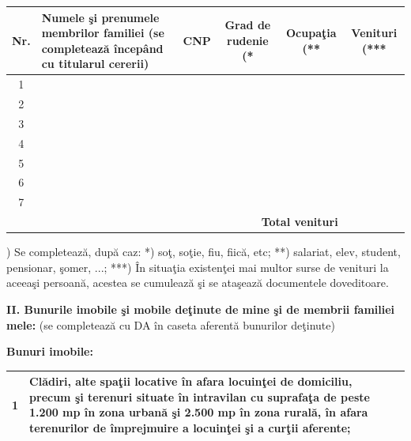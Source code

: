 \documentclass[11pt,a4paper]{article}
\newcommand{\fillline}[1][6cm]{\underline{\hspace{#1}}}
\begin{document}
\renewcommand{\arraystretch}{1.15}
\small
\begin{tabularx}{\textwidth}{|c|X|c|c|c|c|}
\hline
\textbf{Nr.} & \textbf{Numele şi prenumele membrilor familiei} {\scriptsize (se completează începând cu titularul cererii)} & \textbf{CNP} & \textbf{Grad de rudenie} (* & \textbf{Ocupaţia} (** & \textbf{Venituri} (*** \\
\hline
1 & & & & & \\
\hline
2 & & & & & \\
\hline
3 & & & & & \\
\hline
4 & & & & & \\
\hline
5 & & & & & \\
\hline
6 & & & & & \\
\hline
7 & & & & & \\
\hline
\multicolumn{5}{|r|}{\textbf{Total venituri}} & \\
\hline
\end{tabularx}
\normalsize
\renewcommand{\arraystretch}{1.0}

\vspace{0.1cm}

{\scriptsize *) Se completează, după caz: *) soţ, soţie, fiu, fiică, etc; **) salariat, elev, student, pensionar, şomer, ...; ***) În situaţia existenţei mai multor surse de venituri la aceeaşi persoană, acestea se cumulează şi se ataşează documentele doveditoare.}

\vspace{0.2cm}

\textbf{II. Bunurile imobile şi mobile deţinute de mine şi de membrii familiei mele:} \footnotesize (se completează cu DA în caseta aferentă bunurilor deţinute) \normalsize

\vspace{0.1cm}

\textbf{Bunuri imobile:}\\[2pt]
\small
\begin{tabularx}{\textwidth}{|c|X|c|}
\hline
1 & Clădiri, alte spaţii locative în afara locuinţei de domiciliu, precum şi terenuri situate în intravilan cu suprafaţa de peste 1.200 mp în zona urbană şi 2.500 mp în zona rurală, în afara terenurilor de împrejmuire a locuinţei şi a curţii aferente; & \fillline[1.2cm] \\
\hline
\end{tabularx}
\normalsize

\vspace{0.15cm}
\end{document}
